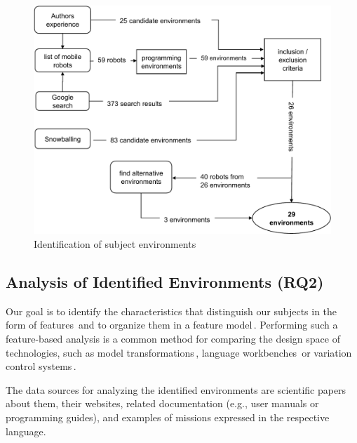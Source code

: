     \begin{figure}[t]
      \centering
      \includegraphics[width=\columnwidth]{fig/selection.pdf}
      \caption{Identification of subject environments}
      \label{fig:selection}
			\vspace{-.4cm}
    \end{figure}
    

\subsection{Analysis of Identified Environments (RQ2)}
\label{sec:extr}
Our goal is to identify the characteristics that distinguish our subjects in the form of features\,\cite{berger2015feature} and to organize them in a feature model\,\cite{kang.ea:1990:foda,damir2019principles}. Performing such a feature-based analysis is a common method for comparing the design space of technologies, such as model transformations\,\cite{transformationSurvey}, language workbenches\,\cite{erdweg2013languageworkbenches} or variation control systems\,\cite{linsbauer2017gpce}.

The data sources for analyzing the identified environments are scientific papers about them, their websites, related documentation (e.g., user manuals or programming guides), and examples of missions expressed in the respective language.


